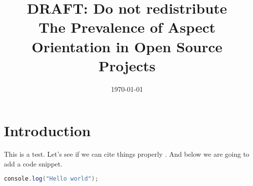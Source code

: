 \documentclass[12pt,twoside]{article}
\title{\Huge{DRAFT: Do not redistribute} \\
  The Prevalence of Aspect Orientation in Open Source Projects
  }
\author{}
\date{\today}
\begin{document}
\maketitle

\tableofcontents
\listoffigures
\lstlistoflistings



\section{Introduction}

This is a test. Let's see if we can cite things properly
\cite{constantinides2002reasoning}. And below we are going to add a code
snippet.


\begin{lstlisting}[language=Java,caption="This is a simple Javascript program"]
  console.log("Hello world");
\end{lstlisting}



\end{document}
